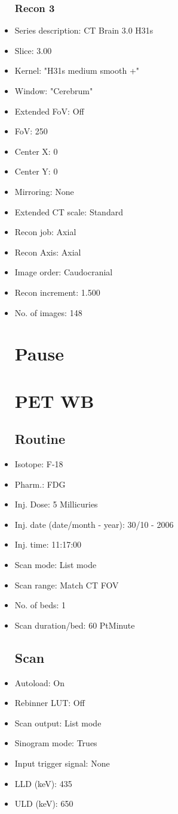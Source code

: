 \documentclass[12pt]{article}
\begin{document}
\begin{itemize}
\subsubsection{Recon 3}
\item Series description: CT Brain 3.0 H31s
\item Slice: 3.00
\item Kernel: "H31s medium smooth +"
\item Window: "Cerebrum"
\item Extended FoV: Off
\item FoV: 250
\item Center X: 0
\item Center Y: 0
\item Mirroring: None
\item Extended CT scale: Standard
\item Recon job: Axial
\item Recon Axis: Axial
\item Image order: Caudocranial
\item Recon increment: 1.500
\item No. of images: 148
\section{Pause}

\section{PET WB}
\subsection{Routine}
\item Isotope: F-18
\item Pharm.: FDG
\item Inj. Dose: 5 Millicuries
\item Inj. date (date/month - year): 30/10 - 2006
\item Inj. time: 11:17:00
\item Scan mode: List mode
\item Scan range: Match CT FOV
\item No. of beds: 1
\item Scan duration/bed: 60 PtMinute
\subsection{Scan}
\item Autoload: On
\item Rebinner LUT: Off
\item Scan output: List mode
\item Sinogram mode: Trues
\item Input trigger signal: None
\item LLD (keV): 435
\item ULD (keV): 650

\end{itemize}
\end{document}
